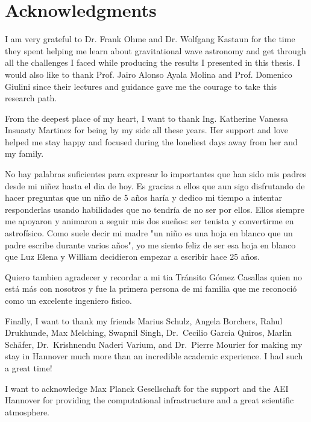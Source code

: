 \chapter*{Acknowledgments}

I am very grateful to Dr. Frank Ohme and Dr. Wolfgang Kastaun for the time they spent helping me learn about gravitational wave astronomy and get through all the challenges I faced while producing the results I presented in this thesis. I would also like to thank Prof. Jairo Alonso Ayala Molina and Prof. Domenico Giulini since their lectures and guidance gave me the courage to take this research path.

From the deepest place of my heart, I want to thank Ing. Katherine Vanessa Insuasty Martinez for being by my side all these years. Her support and love helped me stay happy and focused during the loneliest days away from her and my family.

No hay palabras suficientes para expresar lo importantes que han sido mis padres desde mi niñez hasta el dia de hoy. Es gracias a ellos que aun sigo disfrutando de hacer preguntas que un niño de 5 años haría y dedico mi tiempo a intentar responderlas usando habilidades que no tendría de no ser por ellos. Ellos siempre me apoyaron y animaron a seguir mis dos sueños: ser tenista y convertirme en astrofísico. Como suele decir mi madre "un niño es una hoja en blanco que un padre escribe durante varios años", yo me siento feliz de ser esa hoja en blanco que Luz Elena y William decidieron empezar a escribir hace 25 años.

Quiero tambien agradecer y recordar a mi tia Tránsito Gómez Casallas quien no está más con nosotros y fue la primera persona de mi familia que me reconoció como un excelente ingeniero fisico.

Finally, I want to thank my friends Marius Schulz, Angela Borchers, Rahul Drukhunde, Max Melching, Swapnil Singh, Dr.~Cecilio Garcia Quiros, Marlin Schäfer, Dr.~Krishnendu Naderi Varium, and Dr.~Pierre Mourier for making my stay in Hannover much more than an incredible academic experience. I had such a great time!

I want to acknowledge Max Planck Gesellschaft for the support and the AEI Hannover for providing the computational infrastructure and a great scientific atmosphere.

